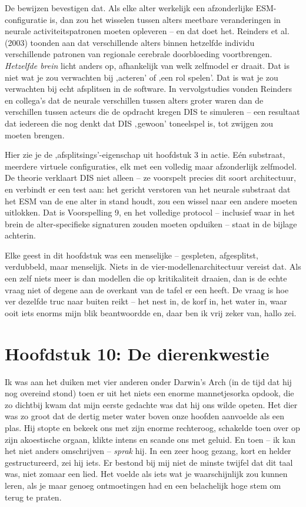 \documentclass[11pt, twoside, openright]{book}
\begin{document}
De bewijzen bevestigen dat. Als elke alter werkelijk een afzonderlijke ESM-configuratie is, dan zou het wisselen tussen alters meetbare veranderingen in neurale activiteitspatronen moeten opleveren -- en dat doet het. Reinders et al. (2003) toonden aan dat verschillende alters binnen hetzelfde individu verschillende patronen van regionale cerebrale doorbloeding voortbrengen. \textit{Hetzelfde brein} licht anders op, afhankelijk van welk zelfmodel er draait. Dat is niet wat je zou verwachten bij ‚acteren' of ‚een rol spelen'. Dat is wat je zou verwachten bij echt afsplitsen in de software. In vervolgstudies vonden Reinders en collega's dat de neurale verschillen tussen alters groter waren dan de verschillen tussen acteurs die de opdracht kregen DIS te simuleren -- een resultaat dat iedereen die nog denkt dat DIS ‚gewoon' toneelspel is, tot zwijgen zou moeten brengen.

Hier zie je de ‚afsplitsings'-eigenschap uit hoofdstuk 3 in actie. Eén substraat, meerdere virtuele configuraties, elk met een volledig maar afzonderlijk zelfmodel. De theorie verklaart DIS niet alleen -- ze voorspelt precies dit soort architectuur, en verbindt er een test aan: het gericht verstoren van het neurale substraat dat het ESM van de ene alter in stand houdt, zou een wissel naar een andere moeten uitlokken. Dat is Voorspelling 9, en het volledige protocol -- inclusief waar in het brein de alter-specifieke signaturen zouden moeten opduiken -- staat in de bijlage achterin.

Elke geest in dit hoofdstuk was een menselijke -- gespleten, afgesplitst, verdubbeld, maar menselijk. Niets in de vier-modellenarchitectuur vereist dat. Als een zelf niets meer is dan modellen die op kritikaliteit draaien, dan is de echte vraag niet of degene aan de overkant van de tafel er een heeft. De vraag is hoe ver dezelfde truc naar buiten reikt -- het nest in, de korf in, het water in, waar ooit iets enorms mijn blik beantwoordde en, daar ben ik vrij zeker van, hallo zei.


\chapter*{Hoofdstuk 10: De dierenkwestie}

Ik was aan het duiken met vier anderen onder Darwin's Arch (in de tijd dat hij nog overeind stond) toen er uit het niets een enorme mannetjesorka opdook, die zo dichtbij kwam dat mijn eerste gedachte was dat hij ons wilde opeten. Het dier was zo groot dat de dertig meter water boven onze hoofden aanvoelde als een plas. Hij stopte en bekeek ons met zijn enorme rechteroog, schakelde toen over op zijn akoestische orgaan, klikte intens en scande ons met geluid. En toen -- ik kan het niet anders omschrijven -- \textit{sprak} hij. In een zeer hoog gezang, kort en helder gestructureerd, zei hij iets. Er bestond bij mij niet de minste twijfel dat dit taal was, niet zomaar een lied. Het voelde als iets wat je waarschijnlijk zou kunnen leren, als je maar genoeg ontmoetingen had en een belachelijk hoge stem om terug te praten.
\end{document}
